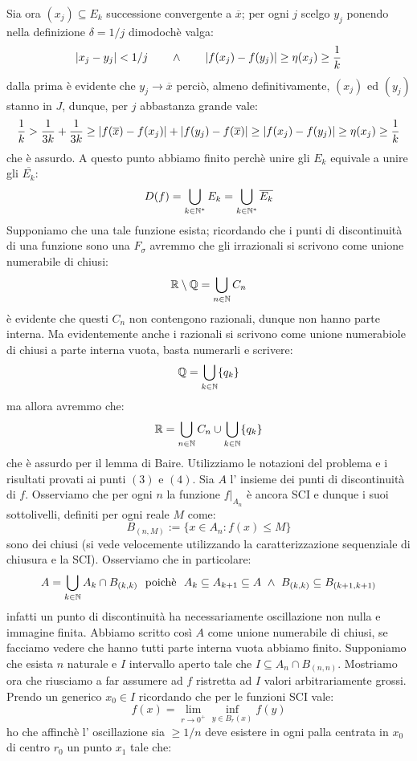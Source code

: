 Sia ora $(x_j)\subseteq E_k$ successione convergente a $\overline{x}$; per ogni $j$ scelgo $y_j$ ponendo nella definizione $\delta=1/j$ dimodochè valga:
$$
\vert{x_j-y_j}\vert<1/j\qquad \wedge \qquad \vert{f(x_j)-f(y_j)}\vert\geq \eta(x_j)\geq \frac{1}{k}
$$
dalla prima è evidente che $y_j\rightarrow \overline{x}$ perciò, almeno definitivamente, $(x_j)$ ed $(y_j)$ stanno in $J$, dunque, per $j$ abbastanza grande vale:
$$
\frac{1}{k}>\frac{1}{3k}+\frac{1}{3k}\geq \vert{f(\overline{x})-f(x_j)}\vert+\vert{f(y_j)-f(\overline{x})}\vert\geq \vert{f(x_j)-f(y_j)}\vert\geq \eta(x_j)\geq \frac{1}{k}
$$
che è assurdo. A questo punto abbiamo finito perchè unire gli $E_k$ equivale a unire gli $\overline{E_k}$:
$$
D(f)=\bigcup_{k\in\mathbb{N}^{*}} E_k=\bigcup_{k\in\mathbb{N}^{*}} \overline{E_k}
$$
 Supponiamo che una tale funzione esista;  ricordando che i punti di discontinuità di una funzione sono una $F_\sigma$ avremmo che gli irrazionali si scrivono come unione numerabile di chiusi:
$$
\mathbb{R} \setminus \mathbb{Q}=\bigcup_{n\in\mathbb{N}} C_n
$$
è evidente che questi $C_n$ non contengono razionali, dunque non hanno parte interna. Ma evidentemente anche i razionali si scrivono come unione numerabiole di chiusi a parte interna vuota, basta numerarli e scrivere:
$$
\mathbb{Q}=\bigcup_{k\in\mathbb{N}} \{q_k\}
$$
ma allora avremmo che:
$$\mathbb{R}=\bigcup_{n\in\mathbb{N}} C_n \cup \bigcup_{k\in\mathbb{N}} \{q_k\}$$
che è assurdo per il lemma di Baire.
 Utilizziamo le notazioni del problema  e i risultati provati ai punti $(3)$ e $(4)$. Sia $A$ l' insieme dei punti di discontinuità di $f$. Osserviamo che per ogni $n$ la funzione $f\vert _{A_n}$ è ancora SCI e dunque i suoi sottolivelli, definiti per ogni reale $M$ come:
$$B_{(n,M)}:=\{x\in A_n: f(x)\leq M\}$$ 
sono dei chiusi (si vede velocemente utilizzando la caratterizzazione sequenziale di chiusura e la SCI). Osserviamo che in particolare: 
$$ A=\bigcup_{k\in \mathbb{N}} A_k\cap B_{(k,k)}\ \mbox{ poichè }\ A_k\subseteq A_{k+1}\subseteq A\ \wedge\ B_{(k,k)}\subseteq B_{(k+1,k+1)} $$
infatti un punto di discontinuità ha necessariamente oscillazione non nulla e immagine finita. Abbiamo scritto così $A$ come unione numerabile di chiusi, se facciamo vedere che hanno tutti parte interna vuota abbiamo finito. Supponiamo che esista $n$ naturale e $I$ intervallo aperto tale che $I\subseteq A_n\cap B_{(n,n)}$. Mostriamo ora che riusciamo a far assumere ad $f$ ristretta ad $I$ valori arbitrariamente grossi. Prendo un generico $x_0\in I$ ricordando che per le funzioni SCI vale:
$$ f(x)=\lim_{r\rightarrow 0^+} \inf_{y\in B_{r}(x)} f(y) $$ 
ho che affinchè l' oscillazione sia $\geq 1/n$ deve esistere in ogni palla centrata in $x_0$ di centro $r_0$ un punto $x_1$ tale che:
